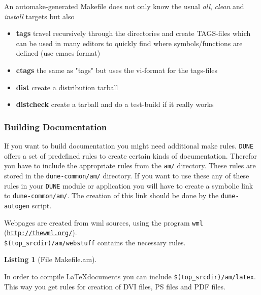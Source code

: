 \documentclass[11pt,a4paper,headinclude,footinclude,DIV16,normalheadings]{scrartcl}
\newtheorem{lst}{Listing}
\newcommand{\dune}{\texttt{DUNE}\xspace}
\newcommand{\autogen}{\texttt{dune-autogen}\xspace}
\begin{document}

An automake-generated Makefile does not only know the usual {\em all},
{\em clean} and {\em install} targets but also
\begin{itemize}
\item {\bf tags} travel recursively through the directories and create
  TAGS-files which can be used in many editors to quickly find where
  symbols/functions are defined (use emacs-format)
\item {\bf ctags} the same as "tags" but uses the vi-format for the tags-files
\item {\bf dist} create a distribution tarball
\item {\bf distcheck} create a tarball and do a test-build if it really works
\end{itemize}

\subsubsection{Building Documentation}
\label{am_includes}

If you want to build documentation you might need additional make
rules. \dune offers a set of predefined rules to create certain kinds
of documentation. Therefor you have to include the appropriate rules
from the \texttt{am/} directory. These rules are stored in the
\texttt{dune-common/am/} directory. If you want to use these any of
these rules in your \dune module or application you will have to
create a symbolic link to \texttt{dune-common/am/}. The creation of
this link should be done by the \autogen script.

Webpages are created from wml sources, using the program \texttt{wml}
(\texttt{\url{http://thewml.org/}}).\\
\texttt{\$(top\_srcdir)/am/webstuff} contains the necessary rules.

\hspace*{-2ex}\begin{minipage}{\textwidth}
\begin{lst}[File Makefile.am] \mbox{}

\end{lst}
\end{minipage}

In order to compile \LaTeX documents you can include
\texttt{\$(top\_srcdir)/am/latex}. This way you get rules for creation
of DVI files, PS files and PDF files.
\end{document}
